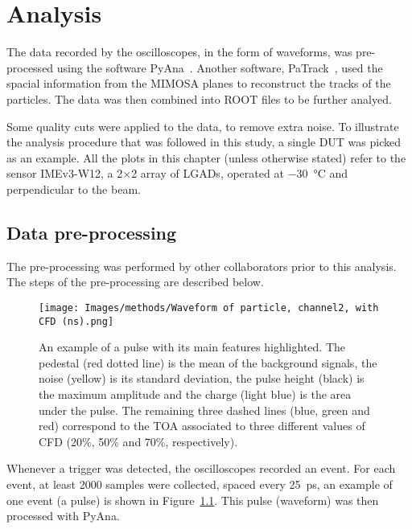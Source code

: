 \chapter{Analysis}\label{chap:analysis}

The data recorded by the oscilloscopes, in the form of waveforms, was pre-processed using the software PyAna~\cite{atlas_hgtd_pyana_2025}. Another software, PaTrack~\cite{atlas_hgtd_patrack_2025}, used the spacial information from the MIMOSA planes to reconstruct the tracks of the particles. The data was then combined into ROOT files to be further analyed.

Some quality cuts were applied to the data, to remove extra noise. To illustrate the analysis procedure that was followed in this study, a single DUT was picked as an example. All the plots in this chapter (unless otherwise stated) refer to the sensor IMEv3-W12, a 2\(\times\)2 array of LGADs, operated at \qty{-30}{\degreeCelsius} and perpendicular to the beam.

\section{Data pre-processing}

The pre-processing was performed by other collaborators prior to this analysis. The steps of the pre-processing are described below.

\begin{figure}[h!btp]
    \centering
    \texttt{[image: Images/methods/Waveform of particle, channel2, with CFD (ns).png]}
    \captionsetup{width=\captionwidth}
    \caption{An example of a pulse with its main features highlighted. The pedestal (red dotted line) is the mean of the background signals, the noise (yellow) is its standard deviation, the pulse height (black) is the maximum amplitude and the charge (light blue) is the area under the pulse. The remaining three dashed lines (blue, green and red) correspond to the TOA associated to three different values of CFD (20\%, 50\% and 70\%, respectively).}
    \label{fig:waveform_features}
\end{figure} 

Whenever a trigger was detected, the oscilloscopes recorded an event. For each event, at least 2000 samples were collected, spaced every \qty{25}{\pico\second}, an example of one event (a pulse) is shown in Figure~\ref{fig:waveform_features}. This pulse (waveform) was then processed with PyAna.

